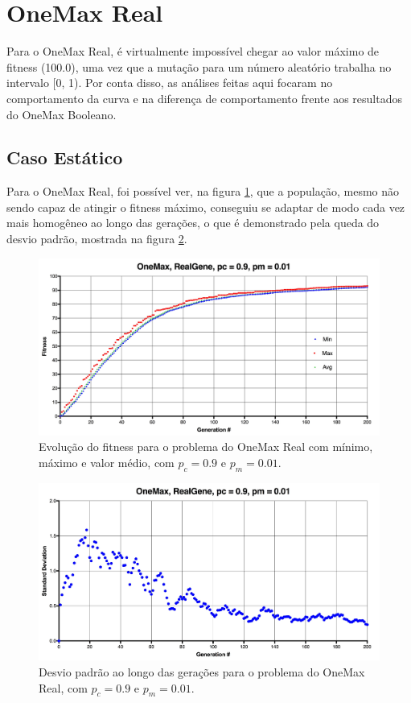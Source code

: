 \section{OneMax Real}

Para o OneMax Real, é virtualmente impossível chegar ao valor máximo de fitness (100.0), uma vez que a mutação para um número aleatório trabalha no intervalo [0, 1). Por conta disso, as análises feitas aqui focaram no comportamento da curva e na diferença de comportamento frente aos resultados do OneMax Booleano.

\subsection{Caso Estático}

Para o OneMax Real, foi possível ver, na figura \ref{fig:onemax_real}, que a população, mesmo não sendo capaz de atingir o fitness máximo, conseguiu se adaptar de modo cada vez mais homogêneo ao longo das gerações, o que é demonstrado pela queda do desvio padrão, mostrada na figura \ref{fig:onemax_real_std}.

\begin{figure}[ht!]
    \centering \includegraphics[width=1.0\textwidth]{onemax_real.jpg}
    \caption{Evolução do fitness para o problema do OneMax Real com mínimo, máximo e valor médio, com $p_c=0.9$ e $p_m=0.01$.}
    \label{fig:onemax_real}
\end{figure}

\begin{figure}[ht!]
    \centering \includegraphics[width=1.0\textwidth]{onemax_real_std.jpg}
    \caption{Desvio padrão ao longo das gerações para o problema do OneMax Real, com $p_c=0.9$ e $p_m=0.01$.}
    \label{fig:onemax_real_std}
\end{figure}

